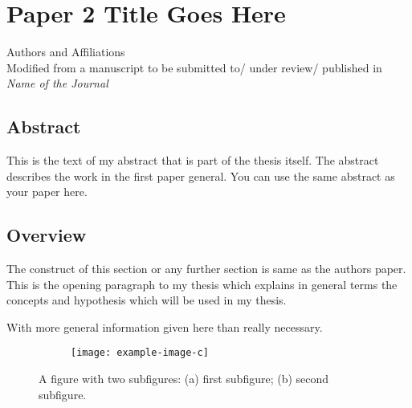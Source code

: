 \chapter{Paper 2 Title Goes Here}

\begin{center}
    Authors and Affiliations \\
    Modified from a manuscript to be submitted to/ under review/ published in \textit{Name of the Journal}
\end{center}

\section{Abstract}
This is the text of my abstract that is part of the thesis itself.
The abstract describes the work in the first paper general. You can use the same abstract as your paper here.



\section{Overview}

The  construct of this section or any further section is same as the authors paper.
This is the opening paragraph to my thesis which
explains in general terms the concepts and hypothesis
which will be used in my thesis.

With more general information given here than really
necessary.
\begin{figure}[b]
    \centering
    \begin{subfigure}[c]{0.495\textwidth}
        \texttt{[image: example-image-c]}%
        \subcaption{\label{fig:2a}}
    \end{subfigure}
    \begin{subfigure}[c]{0.495\textwidth}
        \subcaption{\label{fig:2b}}%
    \end{subfigure}%
    \caption{A figure with two subfigures: (a) first subfigure; (b) second subfigure.\label{fig:2}}
\end{figure}

